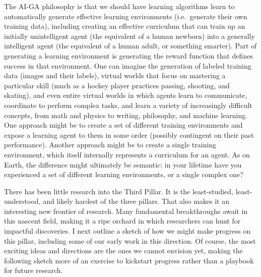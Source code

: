 \documentclass{article}
\begin{document}
The AI-GA philosophy is that we should have learning algorithms learn to automatically generate effective learning environments (i.e.\ generate their own training data), including creating an effective curriculum that can train up an initially unintelligent agent (the equivalent of a human newborn) into a generally intelligent agent (the equivalent of a human adult, or something smarter). Part of generating a learning environment is generating the reward function that defines success in that environment. One can imagine the generation of labeled training data (images and their labels), virtual worlds that focus on mastering a particular skill (much as a hockey player practices passing, shooting, and skating), and even entire virtual worlds in which agents learn to communicate, coordinate to perform complex tasks, and learn a variety of increasingly difficult concepts, from math and physics to writing, philosophy, and machine learning. One approach might be to create a set of different training environments and expose a learning agent to them in some order (possibly contingent on their past performance). Another approach might be to create a single training environment, which itself internally represents a curriculum for an agent. As on Earth, the difference might ultimately be semantic: in your lifetime have you experienced a set of different learning environments, or a single complex one? 

There has been little research into the Third Pillar. It is the least-studied, least-understood, and likely hardest of the three pillars. That also makes it an interesting new frontier of research. Many fundamental breakthroughs await in this nascent field, making it a ripe orchard in which researchers can hunt for impactful discoveries. I next outline a sketch of how we might make progress on this pillar, including some of our early work in this direction. 
Of course, the most exciting ideas and directions are the ones we cannot envision yet, making the following sketch more of an exercise to kickstart progress rather than a playbook for future research. 
\end{document}
